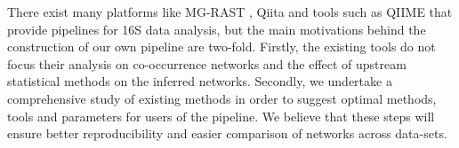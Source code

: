   There exist many platforms like MG-RAST \cite{Keegan2016}, Qiita \cite{qiita} and tools such as QIIME \cite{Caporaso2010} that provide pipelines for 16S data analysis, but the main motivations behind the construction of our own pipeline are two-fold.
  Firstly, the existing tools do not focus their analysis on co-occurrence networks and the effect of upstream statistical methods on the inferred networks.
  Secondly, we undertake a comprehensive study of existing methods in order to suggest optimal methods, tools and parameters for users of the pipeline.
  We believe that these steps will ensure better reproducibility and easier comparison of networks across data-sets.
